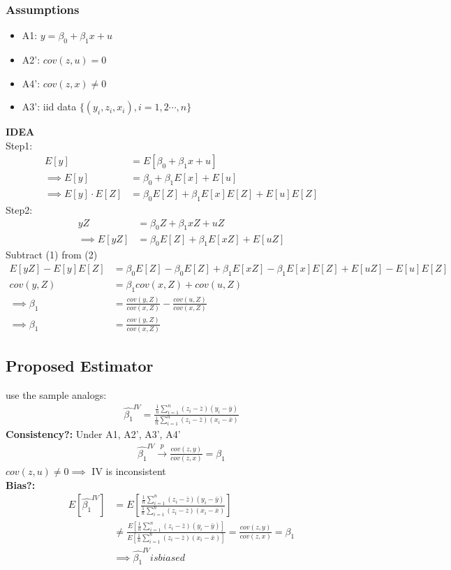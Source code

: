 \documentclass{article}
\theoremstyle{definition}
\theoremstyle{thrm}
\theoremstyle{lma}
\theoremstyle{ppst}
\theoremstyle{crlr}
\begin{document}
\subsubsection{Assumptions}
\begin{itemize}
	\item A1: $y = \beta_0+\beta_1x+u$
	\item A2': $cov(z,u) = 0$
	\item A4': $cov(z,x) \neq 0$
	\item A3': iid data $\{(y_i,z_i,x_i), i=1,2\cdots,n\}$
\end{itemize}
\textbf{IDEA}\\
Step1:
\begin{align*}
	E[y] &= E[\beta_0+\beta_1x+u]\\
	\implies E[y] &= \beta_0 +\beta_1E[x]+E[u]\\
	\implies E[y]\cdot E[Z] &= \beta_0E[Z] +\beta_1E[x]E[Z]+E[u]E[Z]
\end{align*}
Step2: 
\begin{align*}
	yZ &= \beta_0Z+\beta_1xZ+uZ\\
	\implies E[yZ]  &= \beta_0E[Z]+\beta_1E[xZ]+E[uZ]
\end{align*}
Subtract (1) from (2)
\begin{align*}
	E[yZ]-E[y]E[Z] &= \beta_0E[Z]-\beta_0E[Z]+\beta_1E[xZ]-\beta_1E[x]E[Z]+E[uZ]-E[u]E[Z]\\
	cov(y,Z) &= \beta_1cov(x,Z)+cov(u,Z)\\
	\implies \beta_1 &= \frac{cov(y,Z)}{cov(x,Z)} - \frac{cov(u,Z)}{cov(x,Z)}\\
	\implies \beta_1 &= \frac{cov(y,Z)}{cov(x,Z)}
\end{align*}
\subsection{Proposed Estimator}
use the sample analogs:
\begin{align*}
	\hat{\beta_1}^{IV}  = \frac{\frac{1}{n}\sum_{i=1}^n(z_i-\bar{z})(y_i-\bar{y})}{\frac{1}{n}\sum_{i=1}^n(z_i-\bar{z})(x_i-\bar{x})}
\end{align*}
\textbf{Consistency?: } Under A1, A2', A3', A4'
\begin{align*}
	\hat{\beta_1}^{IV} \stackrel{p}{\to} \frac{cov(z,y)}{cov(z,x)} = \beta_1
\end{align*}
$cov(z,u)\neq 0 \implies $ IV is inconsistent\\
\textbf{Bias?: }
\begin{align*}
	E[\hat{\beta_1}^{IV}] &= E[\frac{\frac{1}{n}\sum_{i=1}^n(z_i-\bar{z})(y_i-\bar{y})}{\frac{1}{n}\sum_{i=1}^n(z_i-\bar{z})(x_i-\bar{x})}]\\
	&\neq \frac{E[\frac{1}{n}\sum_{i=1}^n(z_i-\bar{z})(y_i-\bar{y})]}{E[\frac{1}{n}\sum_{i=1}^n(z_i-\bar{z})(x_i-\bar{x})]} = \frac{cov(z,y)}{cov(z,x)} = \beta_1\\
	&\implies \hat{\beta_1}^{IV} is biased
\end{align*}
\end{document}
